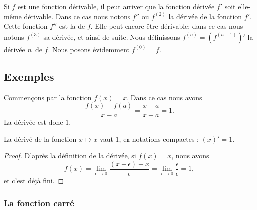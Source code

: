 Si \( f\) est une fonction dérivable, il peut arriver que la fonction dérivée \( f'\) soit elle-même dérivable. Dans ce cas nous notons \( f''\) ou \( f^{(2)}\) la dérivée de la fonction \( f'\). Cette fonction \( f''\) est la  de \( f\). Elle peut encore être dérivable; dans ce cas nous notons \( f^{(3)}\) sa dérivée, et ainsi de suite. Nous définissons \( f^{(n)}=(f^{(n-1)})'\) la dérivée \( n\)\ieme\ de \( f\). Nous posons évidemment \( f^{(0)}=f\).

\subsection{Exemples}

\begin{example}
	Commençons par la fonction \( f(x)=x\). Dans ce cas nous avons
	\begin{equation}
		\frac{ f(x)-f(a) }{ x-a }=\frac{ x-a }{ x-a }=1.
	\end{equation}
	La dérivée est donc \( 1\).
\end{example}

\begin{proposition}
	La dérivé de la fonction \( x\mapsto x\) vaut \( 1\), en notations compactes : \( (x)'=1\).
\end{proposition}

\begin{proof}
	D'après la définition de la dérivée, si \( f(x)=x\), nous avons
	\begin{equation}
		f(x)=\lim_{\epsilon\to 0}\frac{ (x+\epsilon) -x }{\epsilon} =\lim_{\epsilon\to 0}\frac{ \epsilon }{\epsilon} =1,
	\end{equation}
	et c'est déjà fini.
\end{proof}

\subsubsection{La fonction carré}

